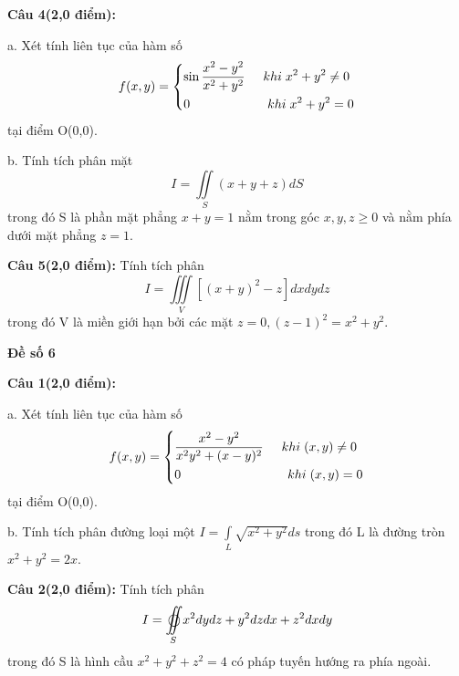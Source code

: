 \documentclass[14pt, a4paper]{article}
\begin{document}
	\vspace{0.5cm}
	
	\textbf{Câu 4(2,0 điểm):}
	
	a. Xét tính liên tục của hàm số
	\[f(x,y) = \left\{ \begin{gathered}
		\sin \frac{{{x^2} - {y^2}}}{{{x^2} + {y^2}}} \hspace{0.5cm} khi \hspace{0.1cm} {x^2} + {y^2} \ne 0  \hfill \\
		0 \hspace{2.15cm} khi \hspace{0.1cm} {x^2} + {y^2} = 0 \hfill \\ 
	\end{gathered}  \right.\] tại điểm O(0,0).

	b. Tính tích phân mặt \[I = \iint\limits_S {(x + y + z)dS}\] trong đó S là phần mặt phẳng $ x+y=1 $ nằm trong góc $ x,y,z \geqslant 0 $ và nằm phía dưới mặt phẳng $ z=1 $.
	
	\vspace{0.5cm}
	
	\textbf{Câu 5(2,0 điểm):} Tính tích phân \[I = \iiint\limits_V {\left[ {{{(x + y)}^2} - z} \right]dxdydz}\] trong đó V là miền giới hạn bởi các mặt $ z = 0,{(z - 1)^2} = {x^2} + {y^2} $.
	
	\pagebreak
	
	\begin{center}
		{\large \textbf{Đề số 6}}
	\end{center}
	
	\textbf{Câu 1(2,0 điểm):}
	
	a. Xét tính liên tục của hàm số
	\[f(x,y) = \left\{ \begin{gathered}
		\frac{{{x^2} - {y^2}}}{{{x^2}{y^2} + {(x-y)^2}}} \hspace{0.5cm} khi \hspace{0.1cm} (x,y) \ne 0  \hfill \\
		0 \hspace{2.95cm} khi \hspace{0.1cm} (x,y) = 0 \hfill \\ 
	\end{gathered}  \right.\] tại điểm O(0,0).

	b. Tính tích phân đường loại một $ I = \int\limits_L {\sqrt {{x^2} + {y^2}} ds} $  trong đó L là đường tròn $ {x^2} + {y^2} = 2x $.
	
	\vspace{0.5cm}
	
	\textbf{Câu 2(2,0 điểm):} Tính tích phân \[I = \mathop{{\int\!\!\!\!\!\int}\mkern-21mu \bigcirc}\limits_S 
	{{x^2}dydz + {y^2}dzdx + {z^2}dxdy} \] trong đó S là hình cầu $ {x^2} + {y^2} + {z^2} = 4 $ có pháp tuyến hướng ra phía ngoài.
	
\end{document}
